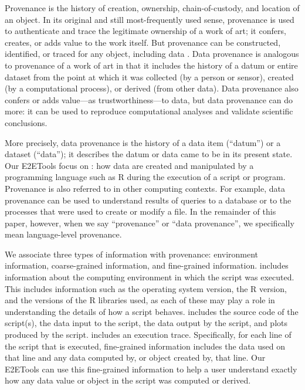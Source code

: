 Provenance is the history of creation, ownership, chain-of-custody, and location of an object. In its original and still most-frequently used sense, provenance is used to authenticate and trace the legitimate ownership of a work of art; it confers, creates, or adds value to the work itself. But provenance can be constructed, identified, or traced for any object, including data \citep{BeckerChambers1988}. Data provenance is analogous to provenance of a work of art in that it includes the history of a datum or entire dataset from the point at which it was collected (by a person or sensor), created (by a computational process), or derived (from other data). Data provenance also confers or adds value---as trustworthiness---to data, but data provenance can do more: it can be used to reproduce computational analyses and validate scientific conclusions. 

More precisely, data provenance is the history of a data item (``datum'') or a dataset (``data''); it describes  the datum or data came to be in its present state. Our E2ETools focus on : how data are created and manipulated by a programming language such as R during the execution of a script or program. Provenance is also referred to in other computing contexts. For example, data provenance can be used to understand results of queries to a database or to the processes that were used to create or modify a file. In the remainder of this paper, however, when we say ``provenance'' or ``data provenance'', we specifically mean language-level provenance.


We associate three types of information with provenance:  environment information, coarse-grained information, and fine-grained information.  includes information about the computing environment in which the script was executed.  This includes information such as the operating system version, the R version, and the versions of the R libraries used, as each of these may play a role in understanding the details of how a script behaves.   includes the source code of the script(s), the data input to the script, the data output by the script, and plots produced by the script.   includes an execution trace.  Specifically, for each line of the script that is executed, fine-grained information includes the data used on that line and any data computed by, or object created by, that line.  Our E2ETools can use this fine-grained information to help a user understand exactly how any data value or object in the script was computed or derived. 

